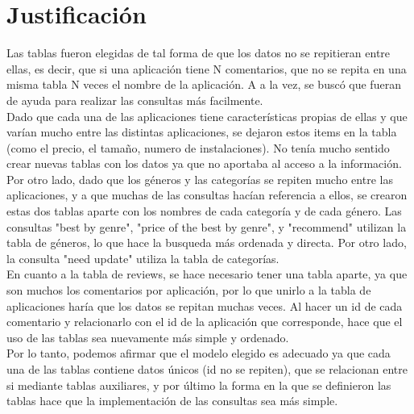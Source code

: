 \documentclass{article}
\begin{document}
\section*{Justificación}
Las tablas fueron elegidas de tal forma de que los datos no se repitieran entre ellas, es decir, que si una aplicación tiene N comentarios, que no se repita en una misma tabla N veces el nombre de la aplicación. A a la vez, se buscó que fueran de ayuda para realizar las consultas más facilmente.\\
Dado que cada una de las aplicaciones tiene características propias de ellas y que varían mucho entre las distintas aplicaciones, se dejaron estos items en la tabla (como el precio, el tamaño, numero de instalaciones). No tenía mucho sentido crear nuevas tablas con los datos ya que no aportaba al acceso a la información.\\
Por otro lado, dado que los géneros y las categorías se repiten mucho entre las aplicaciones, y a que muchas de las consultas hacían referencia a ellos, se crearon estas dos tablas aparte con los nombres de cada categoría y de cada género. Las consultas "best by genre", "price of the best by genre", y "recommend" utilizan la tabla de géneros, lo que hace la busqueda más ordenada y directa. Por otro lado, la consulta "need update" utiliza la tabla de categorías.\\
En cuanto a la tabla de reviews, se hace necesario tener una tabla aparte, ya que son muchos los comentarios por aplicación, por lo que unirlo a la tabla de aplicaciones haría que los datos se repitan muchas veces. Al hacer un id de cada comentario y relacionarlo con el id de la aplicación que corresponde, hace que el uso de las tablas sea nuevamente más simple y ordenado.\\
Por lo tanto, podemos afirmar que el modelo elegido es adecuado ya que cada una de las tablas contiene datos únicos (id no se repiten), que se relacionan entre si mediante tablas auxiliares, y por último la forma en la que se definieron las tablas hace que la implementación de las consultas sea más simple. 
\end{document}
